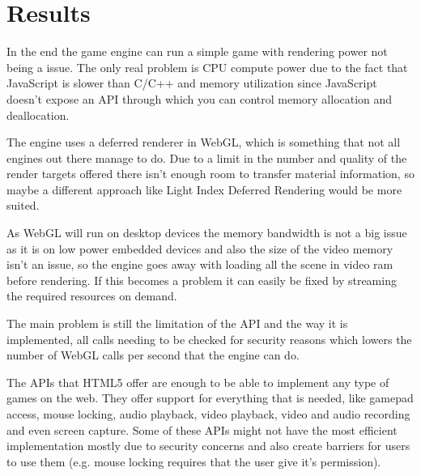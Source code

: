 \chapter{Results}
\label{chapter:Chapter 5}

In the end the game engine can run a simple game with rendering power not being a issue. The only real problem is CPU compute power due to the fact that JavaScript is slower than C/C++ and memory utilization since JavaScript doesn’t expose an API through which you can control memory allocation and deallocation. 

The engine uses a deferred renderer in WebGL, which is something that not all engines out there manage to do. Due to a limit in the number and quality of the render targets offered there isn't enough room to transfer material information, so maybe a different approach like Light Index Deferred Rendering would be more suited.

As WebGL will run on desktop devices the memory bandwidth is not a big issue as it is on low power embedded devices and also the size of the video memory isn't an issue, so the engine goes away with loading all the scene in video ram before rendering. If this becomes a problem it can easily be fixed by streaming the required resources on demand.

The main problem is still the limitation of the API and the way it is implemented, all calls needing to be checked for security reasons which lowers the number of WebGL calls per second that the engine can do.

The APIs that HTML5 offer are enough to be able to implement any type of games on the web. They offer support for everything that is needed, like gamepad access, mouse locking, audio playback, video playback, video and audio recording and even screen capture. Some of these APIs might not have the most efficient implementation mostly due to security concerns and also create barriers for users to use them (e.g. mouse locking requires that the user give it's permission).